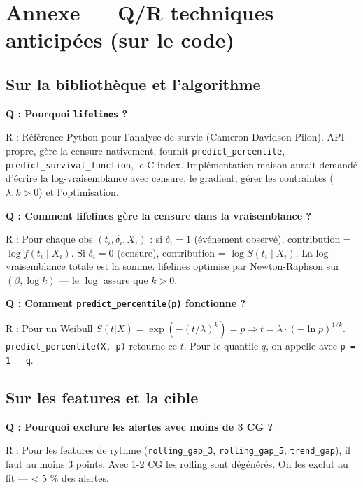 \documentclass[11pt,a4paper]{article}
\begin{document}
\section{Annexe — Q/R techniques anticipées (sur le code)}

\subsection*{Sur la bibliothèque et l'algorithme}

\begin{piege}
\textbf{Q : Pourquoi \texttt{lifelines} ?}

R : Référence Python pour l'analyse de survie (Cameron Davidson-Pilon). API propre, gère la
censure nativement, fournit \texttt{predict\_percentile}, \texttt{predict\_survival\_function},
le C-index. Implémentation maison aurait demandé d'écrire la log-vraisemblance avec censure,
le gradient, gérer les contraintes ($\lambda, k > 0$) et l'optimisation.
\end{piege}

\begin{piege}
\textbf{Q : Comment lifelines gère la censure dans la vraisemblance ?}

R : Pour chaque obs $(t_i, \delta_i, X_i)$ : si $\delta_i = 1$ (événement observé),
contribution = $\log f(t_i \mid X_i)$. Si $\delta_i = 0$ (censure), contribution =
$\log S(t_i \mid X_i)$. La log-vraisemblance totale est la somme. lifelines optimise par
Newton-Raphson sur $(\beta, \log k)$ — le $\log$ assure que $k > 0$.
\end{piege}

\begin{piege}
\textbf{Q : Comment \texttt{predict\_percentile(p)} fonctionne ?}

R : Pour un Weibull $S(t|X) = \exp(-(t/\lambda)^k) = p \Rightarrow t = \lambda \cdot
(-\ln p)^{1/k}$. \texttt{predict\_percentile(X, p)} retourne ce $t$. Pour le quantile $q$,
on appelle avec \texttt{p = 1 - q}.
\end{piege}

\subsection*{Sur les features et la cible}

\begin{piege}
\textbf{Q : Pourquoi exclure les alertes avec moins de 3 CG ?}

R : Pour les features de rythme (\texttt{rolling\_gap\_3}, \texttt{rolling\_gap\_5},
\texttt{trend\_gap}), il faut au moins 3 points. Avec 1-2 CG les rolling sont dégénérés.
On les exclut au fit — < 5 \% des alertes.
\end{piege}
\end{document}
